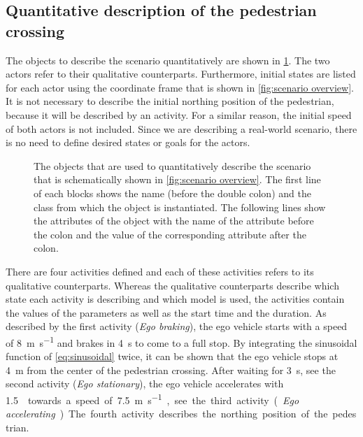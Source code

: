 \subsection{Quantitative description of the pedestrian crossing}
\label{sec:example quantitative}
The objects to describe the scenario quantitatively are shown in \cref{fig:example quantitative}. The two actors refer to their qualitative counterparts. Furthermore, initial states are listed for each actor using the coordinate frame that is shown in \cref{fig:scenario overview}. It is not necessary to describe the initial northing position of the pedestrian, because it will be described by an activity. For a similar reason, the initial speed of both actors is not included. Since we are describing a real-world scenario, there is no need to define desired states or goals for the actors.

\cbend
\begin{figure}
	\centering
	
	\caption{\cbstart The objects that are used to quantitatively describe the scenario that is schematically shown in \cref{fig:scenario overview}. The first line of each blocks shows the name (before the double colon) and the class from which the object is instantiated. The following lines show the attributes of the object with the name of the attribute before the colon and the value of the corresponding attribute after the colon.\cbend}
	\label{fig:example quantitative}
\end{figure}
\cbstart

There are four activities defined and each of these activities refers to its qualitative counterparts. Whereas the qualitative counterparts describe which state each activity is describing and which model is used, the activities contain the values of the parameters as well as the start time and the duration. As described by the first activity (\emph{Ego braking}), the ego vehicle starts with a speed of \SI{8}{\meter\per\second} and brakes in \SI{4}{\second} to come to a full stop. By integrating the sinusoidal function of \cref{eq:sinusoidal} twice, it can be shown that the ego vehicle stops at \SI{4}{\meter} from the center of the pedestrian crossing. After waiting for \SI{3}{\second}, see the second activity (\emph{Ego stationary}), the ego vehicle accelerates with \SI{1.5}{\meter\per\second\square} towards a speed of \SI{7.5}{\meter\per\second}, see the third activity (\emph{Ego accelerating}). The fourth activity describes the northing position of the pedestrian.

